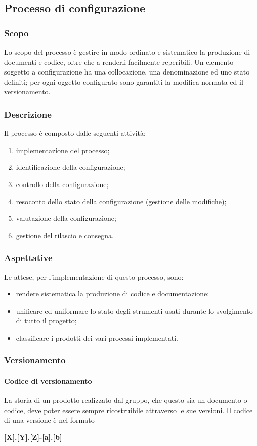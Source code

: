 \subsection{Processo di configurazione}
\subsubsection{Scopo}
Lo scopo del processo è gestire in modo ordinato e sistematico la produzione di documenti e codice, oltre che a renderli facilmente reperibili. Un elemento soggetto a configurazione ha una collocazione, una denominazione ed uno stato definiti; per ogni oggetto configurato sono garantiti la modifica normata ed il versionamento.
\subsubsection{Descrizione}
Il processo è composto dalle seguenti attività:
\begin{enumerate}
	\item implementazione del processo;
	\item identificazione della configurazione;
	\item controllo della configurazione;
	\item resoconto dello stato della configurazione (gestione delle modifiche);
	\item valutazione della configurazione;
	\item gestione del rilascio e consegna.
\end{enumerate}
\subsubsection{Aspettative}
Le attese, per l’implementazione di questo processo, sono:
\begin{itemize}
	\item rendere sistematica la produzione di codice e documentazione;
	\item unificare ed uniformare lo stato degli strumenti usati durante lo svolgimento di tutto
il progetto;
	\item classificare i prodotti dei vari processi implementati.
\end{itemize}
\subsubsection{Versionamento}
\paragraph{Codice di versionamento}
\label{cod-versionamento}
La storia di un prodotto realizzato dal gruppo, che questo sia un documento o codice, deve poter essere sempre ricostruibile attraverso le sue versioni. Il codice di una versione è nel formato\newline
\centerline{\textbf{[X].[Y].[Z]-[a].[b]}}\newline
